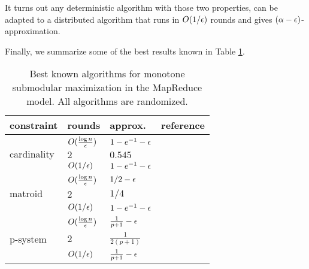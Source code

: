 It turns out any deterministic algorithm with those two properties, can be adapted to a distributed algorithm that runs in $O(1/\epsilon)$ rounds and gives $(\alpha - \epsilon)$-approximation. 

Finally, we summarize some of the best results known in Table \ref{table:distributed}.

\begin{table}[t]
\centering
\begin{tabular}{|l|l|l|l|}
\hline
constraint & rounds  &  approx. & reference \\
\hline
\multirow{3}{*}{cardinality} & $O(\frac{\log n}{\epsilon})$& $1-e^{-1}-\epsilon$ & \cite{KMV+15}\\
\cline{2-4}
                             & $2$ & $0.545$ & \cite{MZ15} \\
\cline{2-4}
                             & $O(1/\epsilon)$ & $1 - e^{-1}-\epsilon$ & \cite{BAN+2015new} \\

\hline


\multirow{3}{*}{matroid}     & $O(\frac{\log n}{\epsilon})$ & $1/2 - \epsilon$ & \cite{KMV+15} \\
\cline{2-4}
                             & $2$ & $1/4$ & \cite{DEN+15} \\
\cline{2-4}
                             & $O(1/\epsilon)$ & $1 - e^{-1}-\epsilon$ & \cite{BAN+2015new} \\
\hline
\multirow{3}{*}{p-system}     & $O(\frac{\log n}{\epsilon})$ & $\frac{1}{p+1} - \epsilon$ & \cite{KMV+15} \\
\cline{2-4}
                            & $2$  & $\frac{1}{2(p + 1)}$ & \cite{DEN+15} \\
\cline{2-4}      
                           & $O(1/\epsilon)$ & $\frac{1}{p + 1} - \epsilon$ & \cite{BAN+2015new}\\
\hline
\end{tabular}
\caption{Best known algorithms  for monotone submodular maximization in the MapReduce model. All algorithms are randomized.}
\label{table:distributed}
\end{table}



